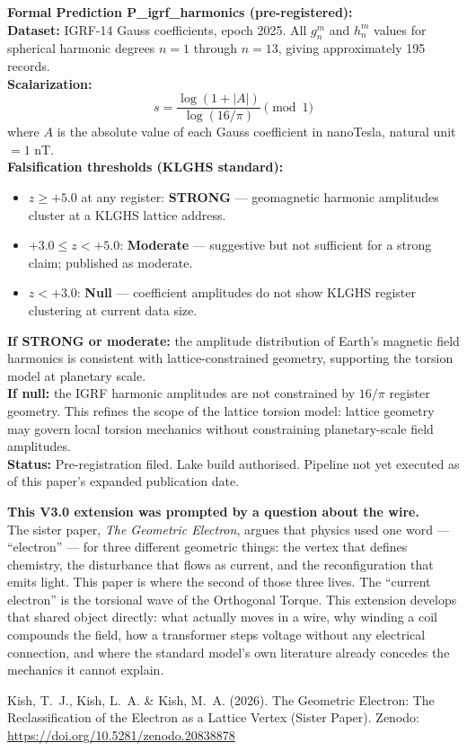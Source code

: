 \documentclass[11pt, letterpaper, openany]{book}
\begin{document}
\begin{predictionbox}
\textbf{Formal Prediction P\_igrf\_harmonics (pre-registered):}\\[0.5em]
\textbf{Dataset:} IGRF-14 Gauss coefficients, epoch 2025.
All $g_n^m$ and $h_n^m$ values for spherical harmonic degrees
$n = 1$ through $n = 13$, giving approximately 195 records.\\[0.5em]
\textbf{Scalarization:}
\[
s = \frac{\log(1 + |A|)}{\log(16/\pi)} \pmod{1}
\]
where $A$ is the absolute value of each Gauss coefficient in
nanoTesla, natural unit $= 1$ nT.\\[0.5em]
\textbf{Falsification thresholds (KLGHS standard):}
\begin{itemize}
    \item $z \geq +5.0$ at any register: \textbf{STRONG} --- geomagnetic
    harmonic amplitudes cluster at a KLGHS lattice address.
    \item $+3.0 \leq z < +5.0$: \textbf{Moderate} --- suggestive but
    not sufficient for a strong claim; published as moderate.
    \item $z < +3.0$: \textbf{Null} --- coefficient amplitudes do not
    show KLGHS register clustering at current data size.
\end{itemize}
\textbf{If STRONG or moderate:} the amplitude distribution of Earth's
magnetic field harmonics is consistent with lattice-constrained geometry,
supporting the torsion model at planetary scale.\\[0.5em]
\textbf{If null:} the IGRF harmonic amplitudes are not constrained by
$16/\pi$ register geometry. This refines the scope of the lattice torsion
model: lattice geometry may govern local torsion mechanics without
constraining planetary-scale field amplitudes.\\[0.5em]
\textbf{Status:} Pre-registration filed. Lake build authorised.
Pipeline not yet executed as of this paper's expanded publication date.
\end{predictionbox}

\clearpage

\begin{bridgebox}
\textbf{This V3.0 extension was prompted by a question about the wire.}\\[0.4em]
The sister paper, \emph{The Geometric Electron}, argues that physics used
one word --- ``electron'' --- for three different geometric things: the
vertex that defines chemistry, the disturbance that flows as current, and
the reconfiguration that emits light. This paper is where the second of
those three lives. The ``current electron'' is the torsional wave of the
Orthogonal Torque. This extension develops that shared object directly:
what actually moves in a wire, why winding a coil compounds the field,
how a transformer steps voltage without any electrical connection, and
where the standard model's own literature already concedes the mechanics
it cannot explain.

Kish, T.~J., Kish, L.~A. \& Kish, M.~A. (2026).
The Geometric Electron: The Reclassification of the Electron as a Lattice Vertex (Sister Paper). 
Zenodo:
\url{https://doi.org/10.5281/zenodo.20838878}
\end{bridgebox}
 
\end{document}
